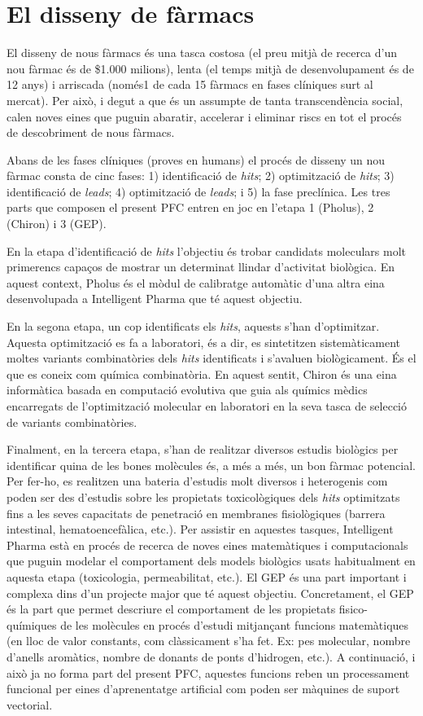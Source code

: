 \section{El disseny de fàrmacs}

El disseny de nous fàrmacs és una tasca costosa (el preu mitjà de recerca d'un
nou fàrmac és de \$1.000 milions), lenta (el temps mitjà de desenvolupament és de
12 anys) i arriscada (només1 de cada 15 fàrmacs en fases clíniques surt al
mercat). Per això, i degut a que és un assumpte de tanta transcendència social,
calen noves eines que puguin abaratir, accelerar i eliminar riscs en tot el
procés de descobriment de nous fàrmacs.

Abans de les fases clíniques (proves en humans) el procés de disseny un nou fàrmac consta de cinc fases: 1) identificació de \emph{hits}; 2) optimització de \emph{hits}; 3) identificació de \emph{leads}; 4) optimització de \emph{leads}; i 5) la fase preclínica. Les tres parts que composen el present PFC entren en joc en l'etapa 1 (Pholus), 2 (Chiron) i 3 (GEP).

En la etapa d'identificació de \emph{hits} l'objectiu és trobar candidats
moleculars molt primerencs capaços de mostrar un determinat llindar d'activitat
biològica. En aquest context, Pholus és el mòdul de calibratge automàtic d'una
altra eina desenvolupada a Intelligent Pharma que té aquest objectiu.

En la segona etapa, un cop identificats els \emph{hits}, aquests s'han
d'optimitzar. Aquesta optimització es fa a laboratori, és a dir, es sintetitzen
sistemàticament moltes variants combinatòries dels \emph{hits} identificats i
s'avaluen biològicament. És el que es coneix com química combinatòria. En aquest
sentit, Chiron és una eina informàtica basada en computació evolutiva que guia
als químics mèdics encarregats de l'optimització molecular en laboratori en la
seva tasca de selecció de variants combinatòries.

Finalment, en la tercera etapa, s'han de realitzar diversos estudis biològics
per identificar quina de les bones molècules és, a més a més, un bon fàrmac
potencial. Per fer-ho, es realitzen una bateria d'estudis molt diversos i
heterogenis com poden ser des d'estudis sobre les propietats toxicològiques dels
\emph{hits} optimitzats fins a les seves capacitats de penetració en membranes
fisiològiques (barrera intestinal, hematoencefàlica, etc.). Per assistir en
aquestes tasques, Intelligent Pharma està en procés de recerca de noves eines
matemàtiques i computacionals que puguin modelar el comportament dels models
biològics usats habitualment en aquesta etapa (toxicologia, permeabilitat,
etc.). El GEP és una part important i complexa dins d'un projecte major que té
aquest objectiu. Concretament, el GEP és la part que permet descriure el
comportament de les propietats fisico-químiques de les molècules en procés
d'estudi mitjançant funcions matemàtiques (en lloc de valor constants, com
clàssicament s'ha fet. Ex: pes molecular, nombre d'anells aromàtics, nombre de
donants de ponts d'hidrogen, etc.). A continuació, i això ja no forma part del
present PFC, aquestes funcions reben un processament funcional per eines
d'aprenentatge artificial com poden ser màquines de suport vectorial.

